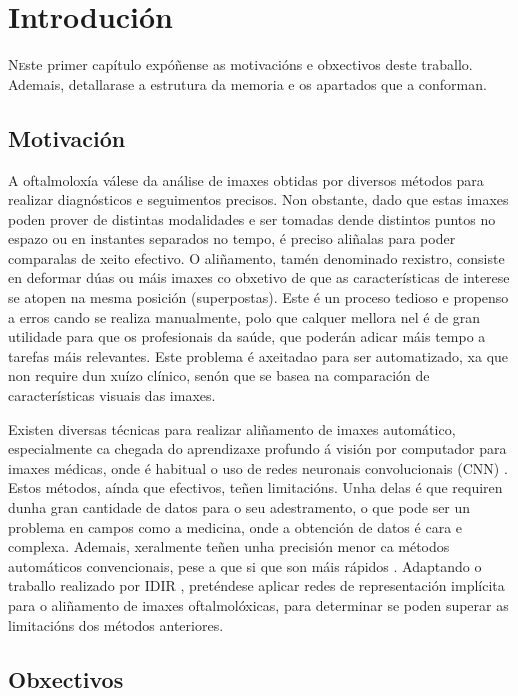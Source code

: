 \chapter{Introdución}
\label{chap:introducion}

\lettrine{N} este primer capítulo expóñense as motivacións e obxectivos deste traballo. Ademais, detallarase a estrutura da memoria e os apartados que a conforman.

\section{Motivación}
\label{sec:motivacion}

A oftalmoloxía válese da análise de imaxes obtidas por diversos métodos para realizar diagnósticos e seguimentos precisos.
Non obstante, dado que estas imaxes poden prover de distintas modalidades e ser tomadas dende distintos puntos no espazo ou en instantes separados no tempo, é preciso aliñalas para poder comparalas de xeito efectivo.
O aliñamento, tamén denominado rexistro, consiste en deformar dúas ou máis imaxes co obxetivo de que as características de interese se atopen na mesma posición (superpostas).
Este é un proceso tedioso e propenso a erros cando se realiza manualmente, polo que calquer mellora nel é de gran utilidade para que os profesionais da saúde, que poderán adicar máis tempo a tarefas máis relevantes.
Este problema é axeitadao para ser automatizado, xa que non require dun xuízo clínico, senón que se basea na comparación de características visuais das imaxes.

Existen diversas técnicas para realizar aliñamento de imaxes automático, especialmente ca chegada do aprendizaxe profundo á visión por computador para imaxes médicas, onde é habitual o uso de redes neuronais convolucionais (\gls{CNN}) \cite{medicalimageanalysis}.
Estos métodos, aínda que efectivos, teñen limitacións. Unha delas é que requiren dunha gran cantidade de datos para o seu adestramento, o que pode ser un problema en campos como a medicina, onde a obtención de datos é cara e complexa. Ademais, xeralmente teñen unha precisión menor ca métodos automáticos convencionais, pese a que si que son máis rápidos \cite{bharati2022deeplearningmedicalimage}.
Adaptando o traballo realizado por IDIR \cite{wolterink2021implicit}, preténdese aplicar redes de representación implícita para o aliñamento de imaxes oftalmolóxicas, para determinar se poden superar as limitacións dos métodos anteriores.

\section{Obxectivos}
\label{sec:obxectivos}

